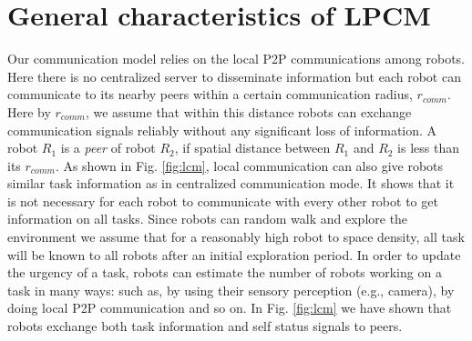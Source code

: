 \section{General characteristics of LPCM}
Our communication model relies on the local P2P communications among robots. Here there is no centralized server to disseminate information but each robot can communicate to its nearby peers within a certain communication radius, $r_{comm}$. Here by $r_{comm}$, we assume that within this distance robots can exchange communication signals reliably without any significant loss of information. A robot $R_1$ is a {\em peer} of robot $R_2$, if spatial distance between $R_1$ and $R_2$ is less than its $r_{comm}$. As shown in Fig. \ref{fig:lcm}, local communication can also give robots similar task information as in centralized communication mode. It shows that it is not necessary for each robot to communicate with every other robot to get information on all tasks. Since robots can random walk and explore the environment we assume that for a reasonably high robot to space density, all task will be known to all robots after an initial exploration period. In order to update the urgency of a task, robots can estimate the number of robots working on a task in many ways: such as, by using their sensory perception (e.g., camera), by doing local P2P communication and so on. In Fig. \ref{fig:lcm} we have shown that robots exchange both task information and self status signals to peers.\\
